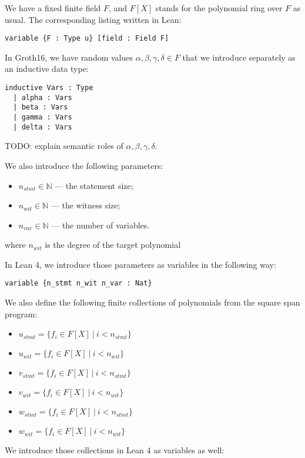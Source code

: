 \documentclass{article}
\theoremstyle{definition}
\theoremstyle{remark}
\begin{document}
We have a fixed finite field $F$, and $F[X]$ stands for the polynomial ring over $F$ as usual. The corresponding listing written in Lean:

\begin{lstlisting}
variable {F : Type u} [field : Field F]
\end{lstlisting}

In Groth16, we have random values $\alpha, \beta, \gamma, \delta \in F$ that we introduce separately as an inductive data type:
\begin{lstlisting}
inductive Vars : Type
  | alpha : Vars
  | beta : Vars
  | gamma : Vars
  | delta : Vars
\end{lstlisting}
TODO: explain semantic roles of $\alpha, \beta, \gamma, \delta$.

We also introduce the following parameters:

\begin{itemize}
\item $n_{stmt} \in \mathbb{N}$ --- the statement size;
\item $n_{wit} \in \mathbb{N}$ --- the witness size;
\item $n_{var} \in \mathbb{N}$ --- the number of variables.
\end{itemize}
where $n_{wit}$ is the degree of the target polynomial

In Lean 4, we introduce those parameters as variables in the following way:

\begin{lstlisting}
variable {n_stmt n_wit n_var : Nat}
\end{lstlisting}

We also define the following finite collections of polynomials from the square span program:

\begin{itemize}
\item $u_{stmt} = \{ f_{i} \in F[X] \: | \: i < n_{stmt} \}$
\item $u_{wit} = \{ f_{i} \in F[X] \: | \: i < n_{wit} \}$
\item $v_{stmt} = \{ f_{i} \in F[X] \: | \: i < n_{stmt} \}$
\item $v_{wit} = \{ f_{i} \in F[X] \: | \: i < n_{wit} \}$
\item $w_{stmt} = \{ f_{i} \in F[X] \: | \: i < n_{stmt} \}$
\item $w_{wit} = \{ f_{i} \in F[X] \: | \: i < n_{wit} \}$
\end{itemize}

We introduce those collections in Lean 4 as variables as well:
\end{document}
